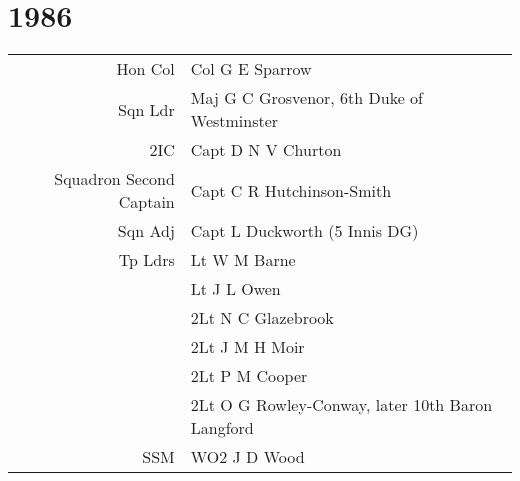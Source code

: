 \chapter*{1986}

\begin{center}
  \small
  \begin{tabular}{rl}
    Hon Col & Col G E Sparrow \\
    Sqn Ldr & Maj G C Grosvenor, 6th Duke of Westminster \\
    2IC & Capt D N V Churton \\
    Squadron Second Captain & Capt C R Hutchinson-Smith \\
    Sqn Adj & Capt L Duckworth (5 Innis DG) \\
    Tp Ldrs & Lt W M Barne \\
      & Lt J L Owen \\
      & 2Lt N C Glazebrook \\
      & 2Lt J M H Moir \\
      & 2Lt P M Cooper \\
      & 2Lt O G Rowley-Conway, later 10th Baron Langford \\
    SSM & WO2 J D Wood \\
  \end{tabular}
\end{center}

